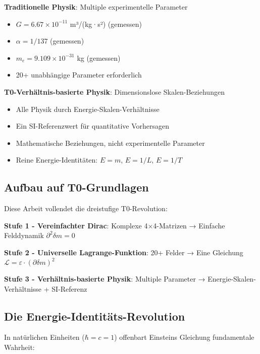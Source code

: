 \documentclass[12pt,a4paper]{article}
\newcommand{\Lag}{\mathcal{L}}
\newcommand{\deltam}{\delta m}
\theoremstyle{definition}
\theoremstyle{remark}
\begin{document}
	\begin{tcolorbox}[colback=red!5!white,colframe=red!75!black,title=Paradigma-Revolution]
		\textbf{Traditionelle Physik}: Multiple experimentelle Parameter
		\begin{itemize}
			\item $G = 6.67 \times 10^{-11}$ m³/(kg·s²) (gemessen)
			\item $\alpha = 1/137$ (gemessen)
			\item $m_e = 9.109 \times 10^{-31}$ kg (gemessen)
			\item 20+ unabhängige Parameter erforderlich
		\end{itemize}
		
		\textbf{T0-Verhältnis-basierte Physik}: Dimensionslose Skalen-Beziehungen
		\begin{itemize}
			\item Alle Physik durch Energie-Skalen-Verhältnisse
			\item Ein SI-Referenzwert für quantitative Vorhersagen
			\item Mathematische Beziehungen, nicht experimentelle Parameter
			\item Reine Energie-Identitäten: $E = m$, $E = 1/L$, $E = 1/T$
		\end{itemize}
	\end{tcolorbox}
	
	\subsection{Aufbau auf T0-Grundlagen}
	
	Diese Arbeit vollendet die dreistufige T0-Revolution:
	
	\textbf{Stufe 1 - Vereinfachter Dirac}: Komplexe 4×4-Matrizen → Einfache Felddynamik $\partial^2 \deltam = 0$
	
	\textbf{Stufe 2 - Universelle Lagrange-Funktion}: 20+ Felder → Eine Gleichung $\Lag = \varepsilon \cdot (\partial \deltam)^2$
	
	\textbf{Stufe 3 - Verhältnis-basierte Physik}: Multiple Parameter → Energie-Skalen-Verhältnisse + SI-Referenz
	
	\subsection{Die Energie-Identitäts-Revolution}
	
	In natürlichen Einheiten ($\hbar = c = 1$) offenbart Einsteins Gleichung fundamentale Wahrheit:
	
\end{document}
